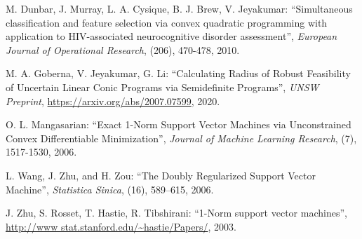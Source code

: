 \documentclass[11pt]{article}
\begin{document}
\begin{thebibliography}{99}

 M. Dunbar, J. Murray, L. A. Cysique, B. J. Brew, V. Jeyakumar: ``Simultaneous classification and feature selection via convex quadratic programming with application to HIV-associated neurocognitive disorder assessment'', \emph{European Journal of Operational Research}, (206), 470-478, 2010. 

 M. A. Goberna, V. Jeyakumar, G. Li: ``Calculating Radius of Robust Feasibility of Uncertain Linear Conic Programs via Semidefinite Programs'', \emph{UNSW Preprint}, \url{https://arxiv.org/abs/2007.07599}, 2020.

 O. L. Mangasarian: ``Exact 1-Norm Support Vector Machines via Unconstrained Convex Differentiable Minimization'', \emph{Journal of Machine Learning Research}, (7), 1517-1530, 2006.

 L. Wang, J. Zhu, and H. Zou: ``The Doubly Regularized Support Vector Machine'', \emph{Statistica Sinica}, (16), 589–615, 2006.

 J. Zhu, S. Rosset, T. Hastie, R. Tibshirani: ``1-Norm support vector machines'', \url{http://www stat.stanford.edu/~hastie/Papers/}, 2003. 






\end{thebibliography}
\end{document}
